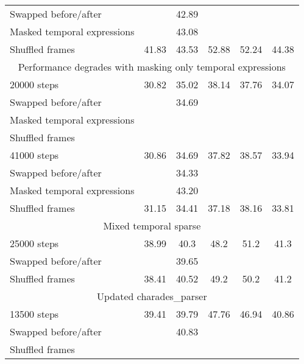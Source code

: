 \begin{table}[htpb]
\begin{tabular}{lccccc}
		Swapped before/after		& 			  &	42.89    &			  &				& \\
		Masked temporal expressions &			  & 43.08    &			  &				& \\
		Shuffled frames				& 41.83		  & 43.53	 & 52.88	  & 52.24		& 44.38 \\
		\midrule
		\midrule
		\multicolumn{6}{c}{Performance degrades with masking only temporal expressions} \\
		20000 steps					& 30.82		  &	35.02	 & 38.14	  &	37.76		& 34.07 \\
		Swapped before/after		&			  &	34.69	 &			  &				& \\
		Masked temporal expressions	&			  &			 &			  &				& \\
		Shuffled frames				&   &  &   &  & \\
        \cmidrule(r){1-1}             \cmidrule(){2-5}                          \cmidrule(l){6-6}
		41000 steps					& 30.86		  & 34.69    & 37.82      & 38.57       & 33.94 \\
		Swapped before/after		&			  & 34.33	 &		      &				& \\
		Masked temporal expressions &			  & 43.20	 &			  &				& \\
		Shuffled frames				& 31.15		  & 34.41	 & 37.18	  & 38.16		& 33.81 \\
		\midrule
		\midrule
		\multicolumn{6}{c}{Mixed temporal sparse} \\
		25000 steps					& 38.99 & 40.3 & 48.2 & 51.2 & 41.3 \\
		Swapped before/after		&		& 39.65 &	&		& \\
		Shuffled frames				& 38.41 & 40.52 & 49.2 & 50.2 & 41.2 \\
		\midrule
		\midrule
		\multicolumn{6}{c}{Updated charades\_parser} \\
		13500 steps					& 39.41 & 39.79 & 47.76 & 46.94 & 40.86 \\
		Swapped before/after		&		& 40.83	&		&		&	\\
		Shuffled frames				&  &  &  &  &  \\
        \bottomrule
	\end{tabular}
\end{table}


